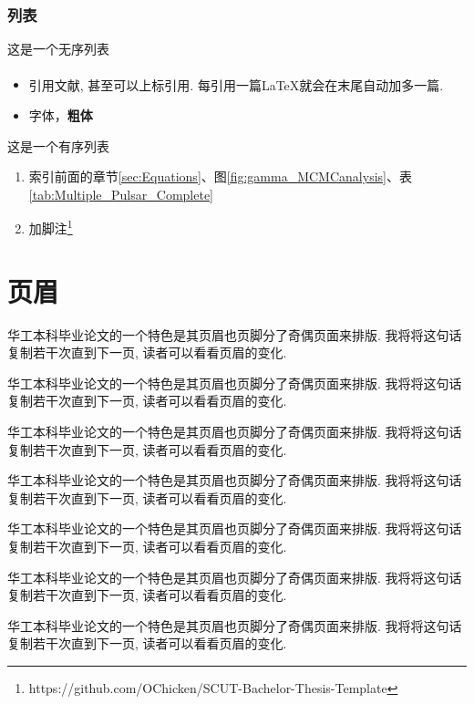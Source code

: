 \documentclass[a4paper]{article}
\newcommand{\upcite}[1]{\textsuperscript{\textsuperscript{\cite{#1}}}}
\begin{document}
\begin{spacing}{1.5}
\subsubsection{列表}
\label{sec:font_list_etc:list}
这是一个无序列表
\begin{itemize}
\item 引用文献\cite{long2015fully}, 甚至可以上标引用\upcite{tighe2013finding}. 每引用一篇\LaTeX 就会在末尾自动加多一篇\upcite{hariharan2014simultaneous}.
\item 字体{\color{red}{变红}}，\textbf{粗体}
\end{itemize}

这是一个有序列表
\begin{enumerate}
\item 索引前面的章节\ref{sec:Equations}、图\ref{fig:gamma_MCMCanalysis}、表\ref{tab:Multiple_Pulsar_Complete}
\item 加脚注\footnote{https://github.com/OChicken/SCUT-Bachelor-Thesis-Template}
\end{enumerate}

\pagebreak[4]

\section{页眉}
华工本科毕业论文的一个特色是其页眉也页脚分了奇偶页面来排版. 我将将这句话复制若干次直到下一页, 读者可以看看页眉的变化.

华工本科毕业论文的一个特色是其页眉也页脚分了奇偶页面来排版. 我将将这句话复制若干次直到下一页, 读者可以看看页眉的变化.

华工本科毕业论文的一个特色是其页眉也页脚分了奇偶页面来排版. 我将将这句话复制若干次直到下一页, 读者可以看看页眉的变化.

华工本科毕业论文的一个特色是其页眉也页脚分了奇偶页面来排版. 我将将这句话复制若干次直到下一页, 读者可以看看页眉的变化.

华工本科毕业论文的一个特色是其页眉也页脚分了奇偶页面来排版. 我将将这句话复制若干次直到下一页, 读者可以看看页眉的变化.

华工本科毕业论文的一个特色是其页眉也页脚分了奇偶页面来排版. 我将将这句话复制若干次直到下一页, 读者可以看看页眉的变化.

华工本科毕业论文的一个特色是其页眉也页脚分了奇偶页面来排版. 我将将这句话复制若干次直到下一页, 读者可以看看页眉的变化.


\end{spacing}
\end{document}
